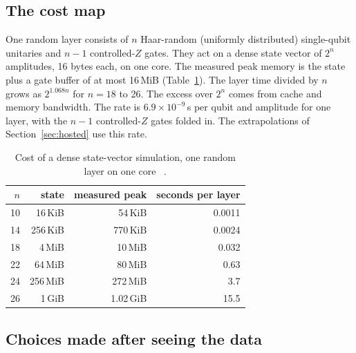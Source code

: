 \subsection{The cost map}\label{app:hosted:cost}

One random layer consists of $n$ Haar-random (uniformly distributed) single-qubit unitaries and $n-1$ controlled-$Z$ gates. They act on
a dense state vector of $2^n$ amplitudes, 16 bytes each, on one core. The measured peak memory is the state plus a gate buffer of at most 16\,MiB
(Table~\ref{tab:hosted:cost}). The layer time divided by $n$ grows as $2^{1.068n}$ for $n=18$ to 26. The excess over $2^n$ comes from
cache and memory bandwidth. The rate is $6.9\times10^{-9}$\,s per qubit and amplitude for one layer, with the $n-1$ controlled-$Z$ gates
folded in. The extrapolations of Section~\ref{sec:hosted} use this rate.

\begin{table}[htb]\centering\footnotesize
\caption{Cost of a dense state-vector simulation, one random layer on one core \tagS~.}\label{tab:hosted:cost}
\begin{tabular}{@{}rrrr@{}}
\toprule
$n$ & state & measured peak & seconds per layer\\
\midrule
10 & 16\,KiB & 54\,KiB & 0.0011\\
14 & 256\,KiB & 770\,KiB & 0.0024\\
18 & 4\,MiB & 10\,MiB & 0.032\\
22 & 64\,MiB & 80\,MiB & 0.63\\
24 & 256\,MiB & 272\,MiB & 3.7\\
26 & 1\,GiB & 1.02\,GiB & 15.5\\
\bottomrule
\end{tabular}
\end{table}

\subsection{Choices made after seeing the data}\label{app:hosted:choices}

